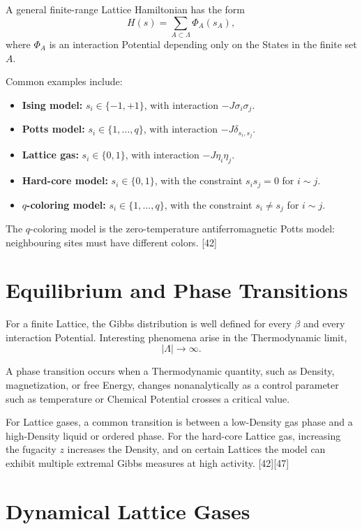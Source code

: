 \documentclass[a4paper, 10pt, onepage]{elegantbook}
\begin{document}
{A general finite-range Lattice Hamiltonian has the form
\[
H(s)
=
\sum_{A\subset\Lambda}
\Phi_A(s_A),
\]
where \(\Phi_A\) is an interaction Potential depending only on the States in
the finite set \(A\).

Common examples include:

\begin{itemize}
\item \textbf{Ising model:} \(s_i\in\{-1,+1\}\), with interaction
\(-J\sigma_i\sigma_j\).
\item \textbf{Potts model:} \(s_i\in\{1,\ldots,q\}\), with interaction
\(-J\delta_{s_i,s_j}\).
\item \textbf{Lattice gas:} \(s_i\in\{0,1\}\), with interaction
\(-J\eta_i\eta_j\).
\item \textbf{Hard-core model:} \(s_i\in\{0,1\}\), with the constraint
\(s_is_j=0\) for \(i\sim j\).
\item \textbf{\(q\)-coloring model:} \(s_i\in\{1,\ldots,q\}\), with the
constraint \(s_i\ne s_j\) for \(i\sim j\).
\end{itemize}

The \(q\)-coloring model is the zero-temperature antiferromagnetic Potts model:
neighbouring sites must have different colors. [42]

\section{Equilibrium and Phase Transitions}

For a finite Lattice, the Gibbs distribution is well defined for every
\(\beta\) and every interaction Potential. Interesting phenomena arise in the
Thermodynamic limit,
\[
|\Lambda|\to\infty.
\]

A phase transition occurs when a Thermodynamic quantity, such as Density,
magnetization, or free Energy, changes nonanalytically as a control parameter
such as temperature or Chemical Potential crosses a critical value.

For Lattice gases, a common transition is between a low-Density gas phase and a
high-Density liquid or ordered phase. For the hard-core Lattice gas, increasing
the fugacity \(z\) increases the Density, and on certain Lattices the model can
exhibit multiple extremal Gibbs measures at high activity. [42][47]

\section*{Dynamical Lattice Gases}

}
\end{document}
